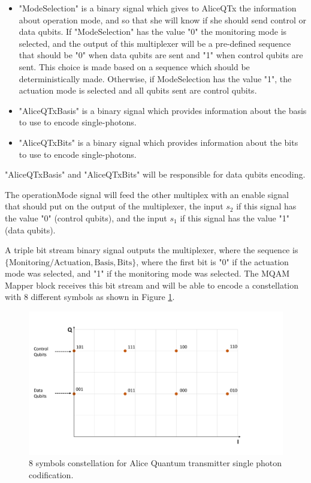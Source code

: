 \begin{itemize}
        \item "ModeSelection" is a binary signal which gives to AliceQTx the information about operation mode, and so that she will know if she should send control or data qubits. If "ModeSelection" has the value "0" the monitoring mode is selected, and the output of this multiplexer will be a pre-defined sequence that should be "0" when data qubits are sent and "1" when control qubits are sent. This choice is made based on a sequence which should be deterministically made. Otherwise, if ModeSelection has the value "1", the actuation mode is selected and all qubits sent are control qubits.

        \item "AliceQTxBasis" is a binary signal which provides information about the basis to use to encode single-photons.

		\item "AliceQTxBits" is a binary signal which provides information about the bits to use to encode single-photons.
	
	\end{itemize}

"AliceQTxBasis" and "AliceQTxBits" will be responsible for data qubits encoding.

The operationMode signal will feed the other multiplex with an enable signal that should put on the output of the multiplexer, the input $s_2$ if this signal has the value "0" (control qubits), and the input $s_1$ if this signal has the value "1"(data qubits).

A triple bit stream binary signal outputs the multiplexer, where the sequence is $\{\textrm{Monitoring/Actuation}, \textrm{Basis}, \textrm{Bits}\}$, where the first bit is "0" if the actuation mode was selected, and "1" if the monitoring mode was selected. The MQAM Mapper block receives this bit stream and will be able to encode a constellation with 8 different symbols as shown in Figure \ref{AliceQTxconstellation}.

\begin{figure}[h]
	\centering
	\includegraphics[clip, trim=0.5cm 0.5cm 0.5cm 0.5cm, width=1.0\textwidth]{./lib/AliceQuantumTx/figures/constellation.pdf}
	\caption{8 symbols constellation for Alice Quantum transmitter single photon codification.}\label{AliceQTxconstellation}
\end{figure}

